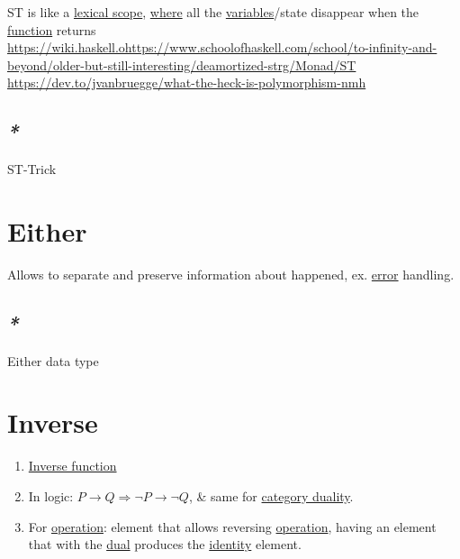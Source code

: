 \documentclass[a4paper,14pt,oneside]{book}
\begin{document}
{ST is like a \hyperref[orga0e6f8f]{lexical scope}, \hyperref[org5b6b021]{where} all the \hyperref[org3e16d0c]{variables}/state disappear when the \hyperref[org6a60524]{function} returns\\
\url{https://wiki.haskell.ohttps://www.schoolofhaskell.com/school/to-infinity-and-beyond/older-but-still-interesting/deamortized-strg/Monad/ST}\\
\url{https://dev.to/jvanbruegge/what-the-heck-is-polymorphism-nmh}\\

\section{\emph{*}}
\label{sec:org1b977af}

\label{orgf2ea77f}ST-Trick\\

\chapter{\label{org25321ee}Either}
\label{sec:org969b17b}

Allows to separate and preserve information about happened, ex. \hyperref[orgb40c72e]{error} handling.\\

\section{\emph{*}}
\label{sec:orgb022676}

\label{org8c40b0a}Either data type\\

\chapter{\label{org5ab3e3c}Inverse}
\label{sec:org49400c7}

\begin{enumerate}
\item \hyperref[orgf750cc9]{Inverse function}\\

\item In logic: \(P \to Q \Rightarrow \neg P \to \neg Q\), \& same for \hyperref[org11ff2a2]{category duality}.\\

\item For \hyperref[org4cee8d5]{operation}: element that allows reversing \hyperref[org4cee8d5]{operation}, having an element that with the \hyperref[orgdbf0070]{dual} produces the \hyperref[org4f76d7c]{identity} element.\\


\end{enumerate}}
\end{document}
